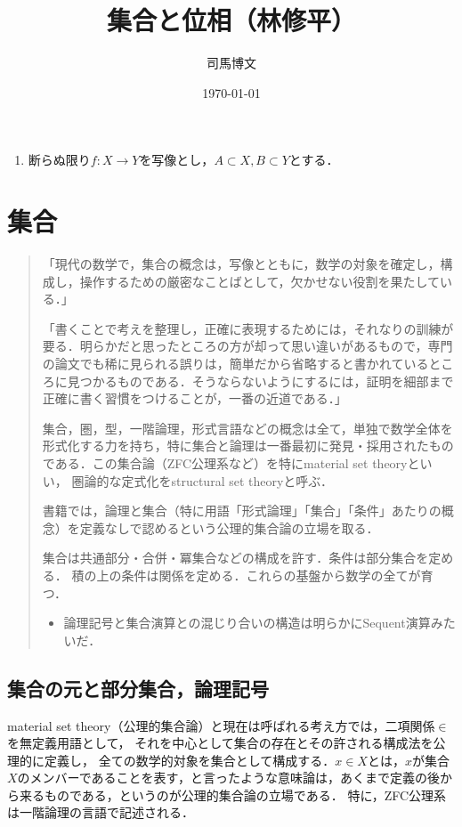 \documentclass[uplatex,dvipdfmx]{jsreport}
\title{集合と位相（林修平）}
\author{司馬博文}
\date{\today}
\begin{document}
\tableofcontents

\begin{notation*}\mbox{}
    \begin{enumerate}
        \item 断らぬ限り$f:X\to Y$を写像とし，$A\subset X,B\subset Y$とする．
    \end{enumerate}
\end{notation*}

\chapter{集合}

\begin{quotation}
    「現代の数学で，集合の概念は，写像とともに，数学の対象を確定し，構成し，操作するための厳密なことばとして，欠かせない役割を果たしている．」\cite{斎藤毅}

    「書くことで考えを整理し，正確に表現するためには，それなりの訓練が要る．明らかだと思ったところの方が却って思い違いがあるもので，専門の論文でも稀に見られる誤りは，簡単だから省略すると書かれているところに見つかるものである．そうならないようにするには，証明を細部まで正確に書く習慣をつけることが，一番の近道である．」\cite{斎藤毅}

    集合，圏，型，一階論理，形式言語などの概念は全て，単独で数学全体を形式化する力を持ち，特に集合と論理は一番最初に発見・採用されたものである．この集合論（ZFC公理系など）を特にmaterial set theoryといい，
    圏論的な定式化をstructural set theoryと呼ぶ．

    書籍\cite{斎藤毅}では，論理と集合（特に用語「形式論理」「集合」「条件」あたりの概念）を定義なしで認めるという公理的集合論の立場を取る．

    集合は共通部分・合併・冪集合などの構成を許す．条件は部分集合を定める．
    積の上の条件は関係を定める．これらの基盤から数学の全てが育つ．

    \begin{itemize}
        \item 論理記号と集合演算との混じり合いの構造は明らかにSequent演算みたいだ．
    \end{itemize}
\end{quotation}

\section{集合の元と部分集合，論理記号}

\begin{screen}
    material set theory（公理的集合論）と現在は呼ばれる考え方では，二項関係$\in$を無定義用語として，
    それを中心として集合の存在とその許される構成法を公理的に定義し，
    全ての数学的対象を集合として構成する．$x\in X$とは，$x$が集合$X$のメンバーであることを表す，と言ったような意味論は，あくまで定義の後から来るものである，というのが公理的集合論の立場である．
    特に，ZFC公理系は一階論理の言語で記述される．
\end{screen}
\end{document}
